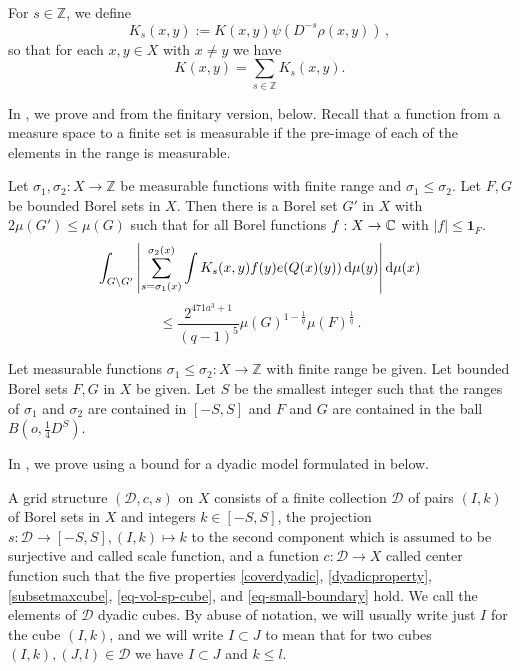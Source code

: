 For $s\in\mathbb{Z}$, we define
\begin{equation}\label{defks}
    K_s(x,y):=K(x,y)\psi(D^{-s}\rho(x,y))\,,
\end{equation}
so that for each $x, y \in X$ with $x\neq y$ we have
$$K(x,y)=\sum_{s\in\mathbb{Z}}K_s(x,y).$$

In , we prove  and 
from the finitary version,  below. Recall
that a function from a measure space to a finite set is measurable if the pre-image of each of the elements in the range is measurable.


\begin{proposition}
\label{finitary-Carleson}
\leanok
{}
Let ${\sigma_1},\sigma_2\colon X\to \mathbb{Z}$ be measurable functions with finite range and ${\sigma_1}\leq \sigma_2$.  Let $F,G$ be bounded Borel sets in $X$. Then there is a Borel set $G'$ in $X$ with $2\mu(G')\leq \mu(G)$ such that
for all Borel functions $f:X\to \mathbb{C}$ with $|f|\le \mathbf{1}_F$.
\begin{equation*}
    \int_{G \setminus G'} \left|\sum_{s={\sigma_1}(x)}^{{\sigma_2}(x)} \int K_s(x,y) f(y) e({Q}(x)(y)) \, \mathrm{d}\mu(y) \right| \mathrm{d}\mu(x)
\end{equation*}
\begin{equation}
    \label{eq-linearized}
    \le \frac{2^{471a^3+1}}{(q-1)^5} \mu(G)^{1-\frac{1}{q}} \mu(F)^{\frac 1 q}\,.
\end{equation}
\end{proposition}
Let measurable functions ${\sigma_1}\leq \sigma_2\colon X\to \mathbb{Z}$ with finite range be given.
Let bounded Borel sets $F,G$ in $X$ be given.
Let $S$ be the smallest integer such that the ranges of
$\sigma_1$ and $\sigma_2$ are contained in $[-S,S]$ and $F$ and $G$ are contained
in the ball $B(o, \frac{1}{4}D^S)$.

In , we prove  using a
bound for a dyadic model formulated in  below.

A grid structure $(\mathcal{D}, c, s)$ on $X$ consists of a finite collection $\mathcal{D}$ of pairs $(I, k)$ of Borel
sets in $X$ and integers $k \in [-S, S]$, the projection $s\colon \mathcal{D}\to [-S, S], (I, k) \mapsto k$ to the second component which is assumed to be surjective and
called scale function, and a function $c:\mathcal{D}\to X$
called center function such that the five properties
\eqref{coverdyadic}, \eqref{dyadicproperty}, \eqref{subsetmaxcube},
\eqref{eq-vol-sp-cube}, and \eqref{eq-small-boundary} hold. We call the elements of $\mathcal{D}$ dyadic cubes. By abuse of notation, we will usually write just $I$ for the cube $(I,k)$, and we will write $I \subset J$ to mean that for two cubes $(I,k), (J, l) \in \mathcal{D}$ we have $I \subset J$ and $k \le l$.

